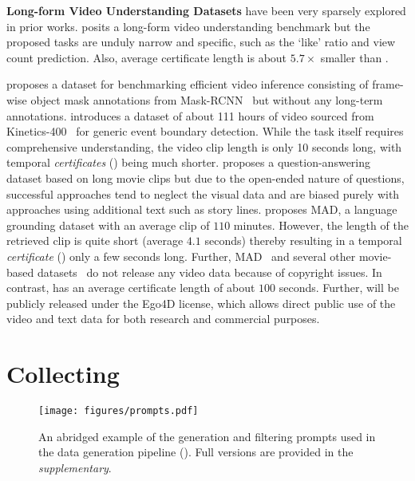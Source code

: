 \noindent \textbf{Long-form Video Understanding Datasets} have been very sparsely explored in prior works. \cite{lvu} posits a long-form video understanding benchmark but the proposed tasks are unduly narrow and specific, such as the `like' ratio and view count prediction. Also, \cite{lvu} average certificate length is about $5.7\times$ smaller than \name{}{}.

\cite{longstream} proposes a dataset for benchmarking efficient video inference consisting of frame-wise object mask annotations from Mask-RCNN~\cite{maskrcnn} but without any long-term annotations. \cite{KineticsGEBD} introduces a dataset of about 111 hours of video sourced from Kinetics-400~\cite{kinetics400} for generic event boundary detection. While the task itself requires comprehensive understanding, the video clip length is only 10 seconds long, with temporal \textit{certificates} () being much shorter. \cite{movieqa} proposes a question-answering dataset based on long movie clips but due to the open-ended nature of questions, successful approaches tend to neglect the visual data and are biased purely with approaches using additional text such as story lines. \cite{mad} proposes MAD, a language grounding dataset with an average clip of $110$ minutes. However, the length of the retrieved clip is quite short (average $4.1$ seconds) thereby resulting in a temporal \textit{certificate} () only a few seconds long. Further, MAD~\cite{mad} and several other movie-based datasets~\cite{movienet, moviegraphs, msa} do not release any video data because of copyright issues. In contrast,\name{}{} has an average certificate length of about $100$ seconds. Further,\name{}{} will be publicly released under the Ego4D license, which allows direct public use of the video and text data for both research and commercial purposes.    

\section{Collecting \name{}{}} 
\label{sec:pipeline}
\begin{figure}[t!]
\center
\texttt{[image: figures/prompts.pdf]}
\caption{An abridged example of the generation and filtering prompts used in the \name{}{} data generation pipeline (). Full versions are provided in the \textit{supplementary}.}
\label{fig:prompt}
\end{figure}

